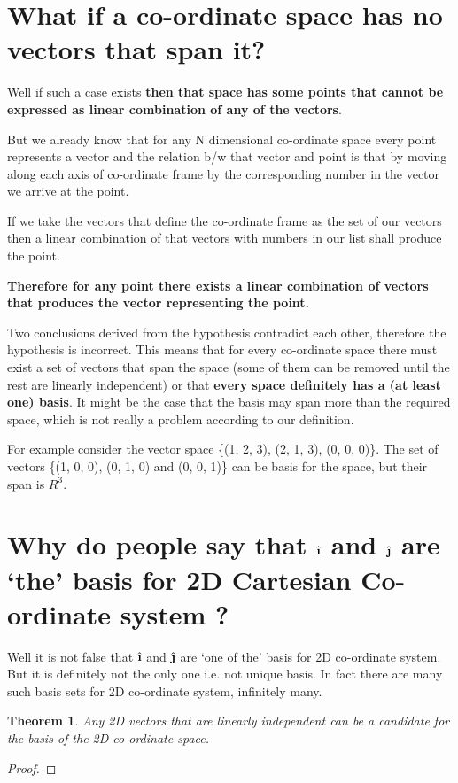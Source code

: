 \documentclass[12pt]{article}
\newtheorem{theorem}{Theorem}
\newcommand{\ihat}{\hat{\textbf{\i}}}
\newcommand{\jhat}{\hat{\textbf{\j}}}
\begin{document}
\section{What if a co-ordinate space has no vectors that span it?}
Well if such a case exists \textbf{then that space has some points that cannot be expressed as linear combination of any of the vectors}.

But we already know that for any N dimensional co-ordinate space every point represents a vector and the relation b/w that vector and point is that by moving along each axis of co-ordinate frame by the corresponding number in the vector we arrive at the point.

If we take the vectors that define the co-ordinate frame as the set of our vectors then a linear combination of that vectors with numbers in our list shall produce the point.

\textbf{Therefore for any point there exists a linear combination of vectors that produces the vector representing the point.}

Two conclusions derived from the hypothesis contradict each other, therefore the hypothesis is incorrect. This means that for every co-ordinate space there must exist a set of vectors that span the space (some of them can be removed until the rest are linearly independent) or that \textbf{every space definitely has a (at least one) basis}. It might be the case that the basis may span more than the required space, which is not really a problem according to our definition.

For example consider the vector space \{(1, 2, 3), (2, 1, 3), (0, 0, 0)\}. The set of vectors \{(1, 0, 0), (0, 1, 0) and (0, 0, 1)\} can be basis for the space, but their span is $ R^3 $.

\section{Why do people say that $ \ihat $ and $ \jhat $ are `the' basis for 2D Cartesian Co-ordinate system ?}
Well it is not false that $ \ihat $ and $ \jhat $ are `one of the' basis for 2D co-ordinate system. But it is definitely not the only one i.e. not unique basis.
In fact there are many such basis sets for 2D co-ordinate system, infinitely many.

\begin{theorem}
Any 2D vectors that are linearly independent can be a candidate for the basis of the 2D co-ordinate space.
\end{theorem}

\begin{proof}
\end{proof}
\end{document}
